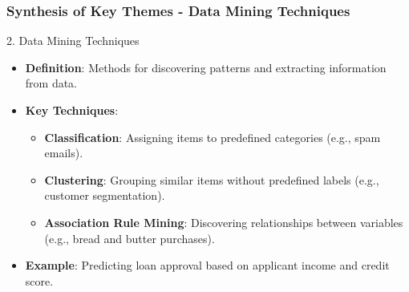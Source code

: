 \documentclass[aspectratio=169]{beamer}
\begin{document}
\begin{frame}[fragile]
    \frametitle{Synthesis of Key Themes - Data Mining Techniques}
    \begin{block}{2. Data Mining Techniques}
        \begin{itemize}
            \item \textbf{Definition}: Methods for discovering patterns and extracting information from data.
            \item \textbf{Key Techniques}:
                \begin{itemize}
                    \item \textbf{Classification}: Assigning items to predefined categories (e.g., spam emails).
                    \item \textbf{Clustering}: Grouping similar items without predefined labels (e.g., customer segmentation).
                    \item \textbf{Association Rule Mining}: Discovering relationships between variables (e.g., bread and butter purchases).
                \end{itemize}
            \item \textbf{Example}: Predicting loan approval based on applicant income and credit score.
        \end{itemize}
    \end{block}
\end{frame}
\end{document}
